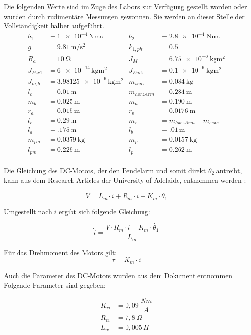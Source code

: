 Die folgenden Werte sind im Zuge des Labors zur Verfügung gestellt worden oder wurden durch rudimentäre Messungen gewonnen. Sie werden an dieser Stelle der Vollständigkeit halber aufgeführt. 
\begin{align*}
b_1 &= \SI{1e-4}{\newton\metre\second} &
b_2 &= \SI{2.8e-4}{\newton\metre\second} \\
g &= \SI{9.81}{\metre\per\square\second} &
k_{1,phi} &= \SI{0.5}{}\\
R_a &= \SI{10}{\ohm} &
J_M  &=  \SI{6.75e-6}{\kilo\gram\square\metre}  \\        %
J_{Enc1}  &=  \SI{6e-14}{\kilo\gram\square\metre}  &        %
J_{Enc2}  &=  \SI{0.1e-6}{\kilo\gram\square\metre}  \\     %
J_{m,b}  &=  \SI{3.98125e-6}{\kilo\gram\square\metre}  &     %
m_{sens}  &=  \SI{0.084}{\kilo\gram}  \\
l_c  &=  \SI{0.01}{\metre}  &
m_{horzArm} &= \SI{0.284}{\metre} \\
m_b &= \SI{0.025}{\metre}  &
m_a &= \SI{0.190}{\metre} \\
r_a &= \SI{0.015}{\metre}  &
r_b &= \SI{0.0176}{\metre} \\
l_r &= \SI{0.29}{\metre} &
m_r  &=  m_{horzArm} - m_{sens}\\
l_a &= \SI{.175}{\metre} &
l_b &= \SI{.01}{\metre}\\
m_{pm} &= \SI{0.0379}{\kilo\gram} &
m_p &= \SI{0.0157}{\kilo\gram}\\
l_{pm} &= \SI{0.229}{\metre} &
l_p &= \SI{0.262}{\metre}\\
\end{align*}

Die Gleichung des DC-Motors, der den Pendelarm und somit direkt $\theta_2$ antreibt, kann aus dem Research Articles der University of Adelaide, entnommen werden \citep{Cazzolato.2011}:

\begin{equation}
V = L_m \cdot \dot{i} + R_m \cdot i + K_m \cdot \theta_1
\end{equation}

Umgestellt nach $ \dot{i}$ ergibt sich folgende Gleichung:

\begin{equation}
 \dot{i} = \dfrac{V \cdot R_m \cdot i - K_m \cdot \dot{\theta_1}}{L_m}
\end{equation}

Für das Drehmoment des Motors gilt:
\begin{equation}
\tau = K_m \cdot i 
\end{equation}

Auch die Parameter des DC-Motors wurden aus dem Dokument entnommen. Folgende Parameter sind gegeben:

\begin{align}
K_m &= 0,09 ~\dfrac{Nm}{A} \\
R_m &= 7,8  ~\Omega \\
L_m &= 0,005  ~H 
\end{align}
